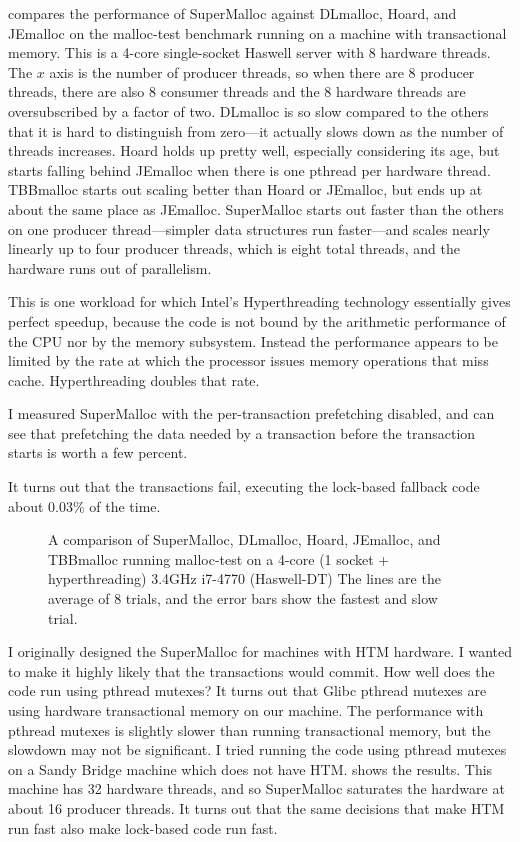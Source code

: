 \documentclass[natbib,sort&compress,10pt]{sigplanconf}
\begin{document}
 compares the performance of SuperMalloc against
DLmalloc, Hoard, and JEmalloc on the malloc-test benchmark running on
a machine with transactional memory.  This is a 4-core single-socket
Haswell server with 8 hardware threads.  The $x$ axis is the number of
producer threads, so when there are $8$ producer threads, there are
also $8$ consumer threads and the 8 hardware threads are
oversubscribed by a factor of two.  DLmalloc is so slow compared to
the others that it is hard to distinguish from zero---it actually
slows down as the number of threads increases.  Hoard holds up pretty
well, especially considering its age, but starts falling behind
JEmalloc when there is one pthread per hardware thread.  TBBmalloc
starts out scaling better than Hoard or JEmalloc, but ends up at about
the same place as JEmalloc.  SuperMalloc starts out faster than the
others on one producer thread---simpler data structures run
faster---and scales nearly linearly up to four producer threads, which
is eight total threads, and the hardware runs out of parallelism.

This is one workload for which Intel's Hyperthreading technology
essentially gives perfect speedup, because the code is not bound by
the arithmetic performance of the CPU nor by the memory subsystem.
Instead the performance appears to be limited by the rate at which the
processor issues memory operations that miss cache.  Hyperthreading
doubles that rate.

I measured SuperMalloc with the per-transaction prefetching disabled,
and can see that prefetching the data needed by a transaction before
the transaction starts is worth a few percent.

It turns out that the transactions fail, executing the lock-based
fallback code about $0.03$\% of the time.

\begin{figure}

\caption{A comparison of SuperMalloc, DLmalloc, Hoard,
  JEmalloc, and TBBmalloc running malloc-test
  on a 4-core (1 socket + hyperthreading) 3.4GHz i7-4770 (Haswell-DT)
  The lines are the average of 8 trials, and the error bars
  show the fastest and slow trial.}
\label{fig:datahtm}
\vspace*{-3ex}
\end{figure}

I originally designed the SuperMalloc for machines with HTM hardware.
I wanted to make it highly likely that the transactions would commit.
How well does the code run using pthread mutexes?  It turns out that
Glibc pthread mutexes are using hardware transactional memory on our
machine.  The performance with pthread mutexes is slightly slower than
running transactional memory, but the slowdown may not be significant.
I tried running the code using pthread mutexes on a Sandy Bridge
machine which does not have HTM\@.   shows the
results. This machine has 32 hardware threads, and so SuperMalloc
saturates the hardware at about 16 producer threads.  It turns out
that the same decisions that make HTM run fast also make lock-based
code run fast.
\end{document}
